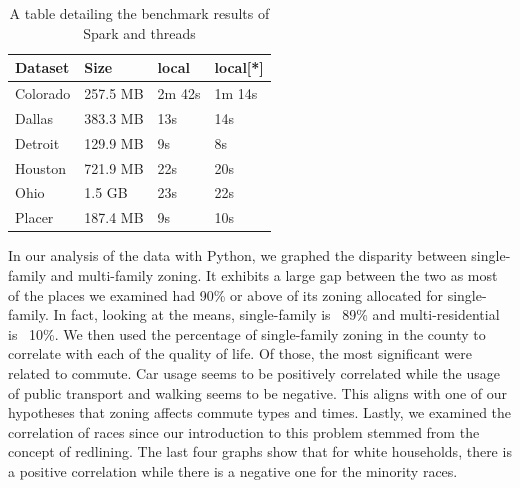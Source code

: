 \documentclass[titlepage]{article}
\begin{document}
\begin{table}[H]
  \centering
  \begin{tabular}{ |p{2cm}|p{2cm}|p{2cm}| p{2cm}| }
  \hline
    Dataset &Size &local &local[*]\\
    \hline
      Colorado & 257.5 MB &2m 42s &1m 14s \\
      Dallas & 383.3 MB &13s &14s \\
      Detroit &129.9 MB &9s &8s \\
      Houston &721.9 MB &22s &20s \\
      Ohio &1.5 GB &23s &22s \\
      Placer &187.4 MB &9s &10s \\
    \hline
  \end{tabular}
  \caption{A table detailing the benchmark results of Spark and threads}
  \end{table}

In our analysis of the data with Python, we graphed the disparity between single-family and multi-family zoning. It exhibits a large gap between the two as most of the places we examined had 90\% or above of its zoning allocated for single-family. In fact, looking at the means, single-family is ~89\% and multi-residential is ~10\%. We then used the percentage of single-family zoning in the county to correlate with each of the quality of life. Of those, the most significant were related to commute. Car usage seems to be positively correlated while the usage of public transport and walking seems to be negative. This aligns with one of our hypotheses that zoning affects commute types and times. Lastly, we examined the correlation of races since our introduction to this problem stemmed from the concept of redlining. The last four graphs show that for white households, there is a positive correlation while there is a negative one for the minority races.
\end{document}
